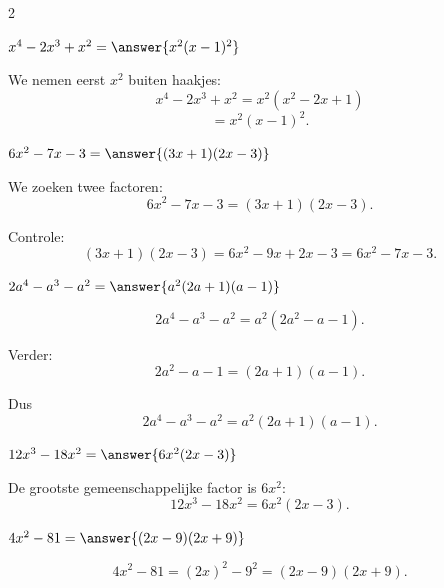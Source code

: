 \documentclass{ximera}
\begin{document}
\begin{oefening}[Ontbinden]{\oefB\ESS}
\begin{multicols}{2}
    
    \begin{question}
    $x^4-2x^3+x^2=\answer{x^2(x-1)^2}$
    
    \begin{oplossing}
    We nemen eerst $x^2$ buiten haakjes:
    \[
    x^4-2x^3+x^2
    =x^2(x^2-2x+1)
    \]
    \[
    =x^2(x-1)^2.
    \]
    \end{oplossing}
    \end{question}
    
    
    \begin{question}
    $6x^2-7x-3=\answer{(3x+1)(2x-3)}$
    
    \begin{oplossing}
    We zoeken twee factoren:
    \[
    6x^2-7x-3
    =(3x+1)(2x-3).
    \]
    
    Controle:
    \[
    (3x+1)(2x-3)
    =6x^2-9x+2x-3
    =6x^2-7x-3.
    \]
    \end{oplossing}
    \end{question}
    
    
    \begin{question}
    $2a^4-a^3-a^2=\answer{a^2(2a+1)(a-1)}$
    
    \begin{oplossing}
    \[
    2a^4-a^3-a^2
    =a^2(2a^2-a-1).
    \]
    
    Verder:
    \[
    2a^2-a-1
    =(2a+1)(a-1).
    \]
    
    Dus
    \[
    2a^4-a^3-a^2
    =a^2(2a+1)(a-1).
    \]
    \end{oplossing}
    \end{question}
    
    
    \begin{question}
    $12x^3-18x^2=\answer{6x^2(2x-3)}$
    
    \begin{oplossing}
    De grootste gemeenschappelijke factor is $6x^2$:
    \[
    12x^3-18x^2
    =6x^2(2x-3).
    \]
    \end{oplossing}
    \end{question}
    
    
    \begin{question}
    $4x^2-81=\answer{(2x-9)(2x+9)}$
    
    \begin{oplossing}
    \[
    4x^2-81
    =(2x)^2-9^2
    =(2x-9)(2x+9).
    \]
    \end{oplossing}
    \end{question}
    

\end{multicols}
\end{oefening}
\end{document}

